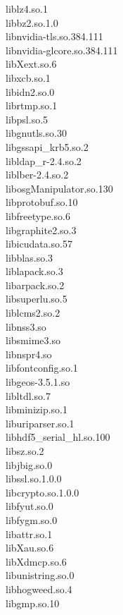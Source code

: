 \begin{multicols}{2}
liblz4.so.1 \\
libbz2.so.1.0 \\
libnvidia-tls.so.384.111 \\
libnvidia-glcore.so.384.111 \\
\columnbreak
libXext.so.6 \\
libxcb.so.1 \\
libidn2.so.0 \\
librtmp.so.1 \\
libpsl.so.5 \\
libgnutls.so.30 \\
libgssapi\_krb5.so.2 \\
libldap\_r-2.4.so.2 \\
liblber-2.4.so.2 \\
libosgManipulator.so.130 \\
libprotobuf.so.10 \\
libfreetype.so.6 \\
libgraphite2.so.3 \\
libicudata.so.57 \\
libblas.so.3 \\
liblapack.so.3 \\
libarpack.so.2 \\
libsuperlu.so.5 \\
liblcms2.so.2 \\
libnss3.so \\
libsmime3.so \\
libnspr4.so \\
libfontconfig.so.1 \\
libgeos-3.5.1.so \\
libltdl.so.7 \\
libminizip.so.1 \\
liburiparser.so.1 \\
libhdf5\_serial\_hl.so.100 \\
libsz.so.2 \\
libjbig.so.0 \\
libssl.so.1.0.0 \\
libcrypto.so.1.0.0 \\
libfyut.so.0 \\
libfygm.so.0 \\
libattr.so.1 \\
libXau.so.6 \\
libXdmcp.so.6 \\
libunistring.so.0 \\
libhogweed.so.4 \\
libgmp.so.10 \\

\end{multicols}
